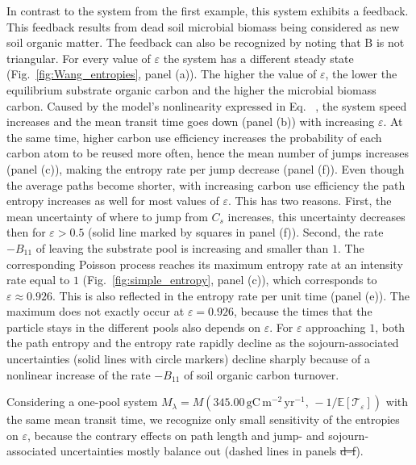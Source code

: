 \documentclass[smallextended]{svjour3}
\makeatletter
\renewcommand*{\eqref}[1]{%
  \hyperref[{#1}]{\textup{\tagform@{\ref*{#1}}}}%
}
\renewcommand{\tens}[1]{\mathrm{#1}}
\newcommand{\E}{\mathbb{E}}
\newcommand{\TT}{\mathcal{T}}
\newcommand{\gC}{\mathrm{gC}}
\newcommand{\yr}{\mathrm{yr}}
\newcommand{\meter}{\mathrm{m}}
\providecommand{\DIFaddtex}[1]{{\protect\color{blue}\uwave{#1}}} %
\providecommand{\DIFdeltex}[1]{{\protect\color{red}\sout{#1}}}                      %
\providecommand{\DIFaddbegin}{} %
\providecommand{\DIFaddend}{} %
\providecommand{\DIFdelbegin}{} %
\providecommand{\DIFdelend}{} %
\providecommand{\DIFadd}[1]{\texorpdfstring{\DIFaddtex{#1}}{#1}} %
\providecommand{\DIFdel}[1]{\texorpdfstring{\DIFdeltex{#1}}{}} %
\newcommand{\DIFscaledelfig}{0.5}
\newlength{\DIFdelgraphicswidth} %
\newlength{\DIFdelgraphicsheight} %
\newcommand{\DIFaddincludegraphics}[2][]{{\color{blue}\fbox{\DIFOincludegraphics[#1]{#2}}}} %
\newcommand{\DIFdelincludegraphics}[2][]{%
\sbox{\DIFdelgraphicsbox}{\DIFOincludegraphics[#1]{#2}}%
\settoboxwidth{\DIFdelgraphicswidth}{\DIFdelgraphicsbox} %
\settoboxtotalheight{\DIFdelgraphicsheight}{\DIFdelgraphicsbox} %
\scalebox{\DIFscaledelfig}{%
\parbox[b]{\DIFdelgraphicswidth}{\usebox{\DIFdelgraphicsbox}\\[-\baselineskip] \rule{\DIFdelgraphicswidth}{0em}}\llap{\resizebox{\DIFdelgraphicswidth}{\DIFdelgraphicsheight}{%
\setlength{\unitlength}{\DIFdelgraphicswidth}%
\begin{picture}(1,1)%
\thicklines\linethickness{2pt} %
{\color[rgb]{1,0,0}\put(0,0){\framebox(1,1){}}}%
{\color[rgb]{1,0,0}\put(0,0){\line( 1,1){1}}}%
{\color[rgb]{1,0,0}\put(0,1){\line(1,-1){1}}}%
\end{picture}%
}\hspace*{3pt}}} %
} %
\DeclareRobustCommand{\DIFaddbegin}{\DIFOaddbegin \let\includegraphics\DIFaddincludegraphics} %
\DeclareRobustCommand{\DIFaddend}{\DIFOaddend \let\includegraphics\DIFOincludegraphics} %
\DeclareRobustCommand{\DIFdelbegin}{\DIFOdelbegin \let\includegraphics\DIFdelincludegraphics} %
\DeclareRobustCommand{\DIFdelend}{\DIFOaddend \let\includegraphics\DIFOincludegraphics} %
\makeatother
\begin{document}
In contrast to the system from the first example, this system exhibits a feedback.
This feedback results from dead soil microbial biomass being considered as new soil organic matter.
The feedback can also be recognized by noting that $\tens{B}$ is not triangular.
For every value of $\varepsilon$ the system has a different steady state (Fig.~\ref{fig:Wang_entropies}, panel (a)).
The higher the value of $\varepsilon$, the lower the equilibrium substrate organic carbon and the higher the microbial biomass carbon.
Caused by the model's nonlinearity expressed in Eq.~\eqref{eqn:lambdax}, the system speed increases and the mean transit time goes down (panel (b)) with increasing $\varepsilon$.
At the same time, higher carbon use efficiency increases the probability of each carbon atom to be reused more often, hence the mean number of jumps increases (panel (c)), making the entropy rate per jump decrease (panel (f)).
Even though the average paths become shorter, with increasing carbon use efficiency the path entropy increases as well for most values of $\varepsilon$.
This has two reasons.
First, the mean uncertainty of where to jump from $C_s$ increases, this uncertainty decreases then for $\varepsilon>0.5$ (solid line marked by squares in panel (f)).
Second, the rate $-B_{11}$ of leaving the substrate pool is increasing and smaller than $1$.
The corresponding Poisson process reaches its maximum entropy rate at an intensity rate equal to $1$ (Fig.~\ref{fig:simple_entropy}, panel (c)), which corresponds to $\varepsilon\approx0.926$.
This is also reflected in the entropy rate per unit time (panel (e)).
The maximum does not exactly occur at $\varepsilon=0.926$, because the times that the particle stays in the different pools also depends on $\varepsilon$.
For $\varepsilon$ approaching $1$, both the path entropy and the entropy rate rapidly decline as the sojourn-associated uncertainties (solid lines with circle markers) decline sharply because of a nonlinear increase of the rate $-B_{11}$ of soil organic carbon turnover.

Considering a one-pool system $M_\lambda=M(345.00\,\gC\,\meter^{-2}\,\yr^{-1},\, -1/\E\left[\TT_\varepsilon\right])$ with the same mean transit time, we recognize only small sensitivity of the entropies on $\varepsilon$, because the contrary effects on path length and jump- and sojourn-associated uncertainties mostly balance out (dashed lines in panels \DIFdelbegin \DIFdel{d--f}\DIFdelend \DIFaddbegin \DIFadd{(d)--(f)}\DIFaddend ).
\end{document}
